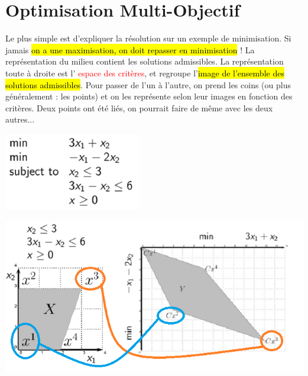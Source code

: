 \documentclass[a4paper, 12pt]{article}
\newcommand{\alinea}{
\hspace*{0.5cm}}
\newcommand{\red}[1]{
	\textcolor{red}{#1}}
\begin{document}
\section{Optimisation Multi-Objectif}
	\alinea Le plus simple est d'expliquer la résolution sur un exemple de minimisation. Si jamais \hl{on a une maximisation, on doit 
		repasser en minimisation} ! La représentation du milieu contient les solutions admissibles.
		La représentation toute à droite est l'\red{espace des critères}, et regroupe 
		l'\hl{image de l'ensemble des solutions admissibles}. Pour passer de l'un à l'autre, on prend les coins (ou plus généralement :
		les points) et on les représente selon leur images en fonction des critères. Deux points ont été liés, on pourrait 
		faire de même avec les deux autres...~\\
	\begin{minipage}{0.25\textwidth}
		\includegraphics[width=\textwidth]{Images/multi-obj}
	\end{minipage}\hfill
	\begin{minipage}{0.66\textwidth}
		\includegraphics[width=\textwidth]{Images/decisions}
	\end{minipage}~\\~\\~\\
\end{document}
